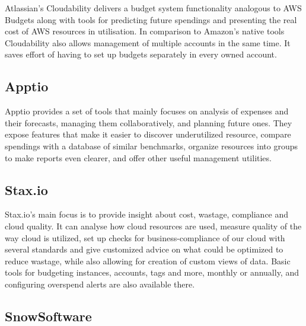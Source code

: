 \documentclass[licencjacka,en]{thesisclass}
\begin{document}
    Atlassian's Cloudability delivers a budget system functionality analogous to AWS Budgets
    along with tools for predicting future spendings and presenting the real cost of AWS resources in utilisation.
    In comparison to Amazon's native tools Cloudability also allows management of multiple accounts in the same time. It saves effort of having to set up budgets separately in every owned account.

    \begin{flushright}
        \cite{Cloudability}
    \end{flushright}

    \subsection{Apptio}

    Apptio provides a set of tools that mainly focuses on analysis of expenses and their forecasts,
    managing them collaboratively, and planning future ones.
    They expose features that make it easier to discover underutilized resource,
    compare spendings with a database of similar benchmarks,
    organize resources into groups to make reports even clearer,
    and offer other useful management utilities.

    \begin{flushright}
        \cite{Apptio}
    \end{flushright}

    \subsection{Stax.io}

    Stax.io's main focus is to provide insight about cost, wastage, compliance and cloud quality.
    It can analyse how cloud resources are used, measure quality of the way cloud is utilized,
    set up checks for business-compliance of our cloud with several standards
    and give customized advice on what could be optimized to reduce wastage,
    while also allowing for creation of custom views of data.
    Basic tools for budgeting instances, accounts, tags and more, monthly or annually,
    and configuring overspend alerts are also available there.

    \begin{flushright}
        \cite{Stax.io}
    \end{flushright}

    \subsection{SnowSoftware}
\end{document}
